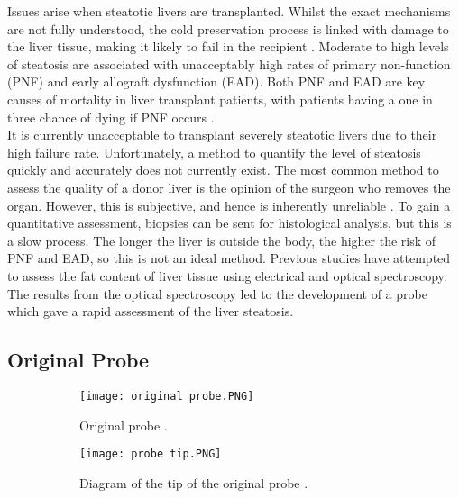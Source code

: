 Issues arise when steatotic livers are transplanted. Whilst the exact mechanisms are not fully understood, the cold preservation process is linked with damage to the liver tissue, making it likely to fail in the recipient \cite{Imber2002}. Moderate to high levels of steatosis are associated with unacceptably high rates of primary non-function (PNF) and early allograft dysfunction (EAD). Both PNF and EAD are key causes of mortality in liver transplant patients, with patients having a one in three chance of dying if PNF occurs \cite{Robertson}.\\

It is currently unacceptable to transplant severely steatotic livers due to their high failure rate. Unfortunately, a method to quantify the level of steatosis quickly and accurately does not currently exist. The most common method to assess the quality of a donor liver is the opinion of the surgeon who removes the organ. However, this is subjective, and hence is inherently unreliable \cite{Robertson}. To gain a quantitative assessment, biopsies can be sent for histological analysis, but this is a slow process. The longer the liver is outside the body, the higher the risk of PNF and EAD, so this is not an ideal method. Previous studies \cite{McLaughlin2010} have attempted to assess the fat content of liver tissue using electrical and optical spectroscopy. The results from the optical spectroscopy led to the development of a probe \cite{Robertson} which gave a rapid assessment of the liver steatosis. \\


\subsection{Original Probe}

\begin{figure}[htb]
	\centering
	\begin{subfigure}[b]{0.4\linewidth}
		\texttt{[image: original probe.PNG]}
		\caption{Original probe \cite{Robertson}.}
		\label{fig: original probe}
	\end{subfigure}
	\begin{subfigure}[b]{0.4\linewidth}
		\texttt{[image: probe tip.PNG]}
		\caption{Diagram of the tip of the original probe \cite{Robertson}.}
		\label{fig: probe tip}
	\end{subfigure}
	\caption{}
\end{figure}

